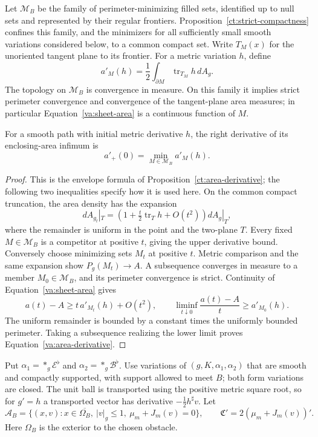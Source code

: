 Let \(\mathcal M_B\) be the family of perimeter-minimizing filled sets,
identified up to null sets and represented by their regular frontiers.
Proposition~\ref{ct:strict-compactness} confines this family, and the minimizers
for all sufficiently small smooth variations considered below, to a common
compact set.  Write \(T_M(x)\) for the unoriented tangent plane to its
frontier.  For a metric variation \(h\), define
\begin{equation}\label{va:sheet-area}
 a'_M(h)=\frac12\int_{\partial M}\operatorname{tr}_{T_M}h\,dA_g.
\end{equation}
The topology on \(\mathcal M_B\) is convergence in measure.  On this
family it implies strict perimeter convergence and convergence of the
tangent-plane area measures; in particular Equation~\eqref{va:sheet-area}
is a continuous function of \(M\).

\begin{lemma}\label{va:area-envelope}
For a smooth path with initial metric derivative \(h\), the right
derivative of its enclosing-area infimum is
\begin{equation}\label{va:area-derivative}
 a'_+(0)=\min_{M\in\mathcal M_B}a'_M(h).
\end{equation}
\end{lemma}
\begin{proof}
This is the envelope formula of Proposition~\ref{ct:area-derivative}; the
following two inequalities specify how it is used here.  On the common
compact truncation, the area density has the expansion
\[
 dA_{g_t}|_T=\left(1+\tfrac t2\operatorname{tr}_T h+O(t^2)\right)dA_g|_T,
\]
where the remainder is uniform in the point and the two-plane \(T\).
Every fixed \(M\in\mathcal M_B\) is a competitor at positive \(t\), giving
the upper derivative bound.  Conversely choose minimizing sets \(M_t\)
at positive \(t\).  Metric comparison and the same expansion show
\(P_g(M_t)\to A\).  A subsequence converges in measure to a member
\(M_0\in\mathcal M_B\), and its perimeter convergence is strict.
Continuity of Equation~\eqref{va:sheet-area} gives
\[
 a(t)-A\ge t\,a'_{M_t}(h)+O(t^2),
 \qquad \liminf_{t\downarrow0}\frac{a(t)-A}{t}\ge a'_{M_0}(h).
\]
The uniform remainder is bounded by a constant times the uniformly
bounded perimeter.  Taking a subsequence realizing the lower limit proves
Equation~\eqref{va:area-derivative}.
\end{proof}

Put \(\alpha_1=*_{g}\mathcal E^\flat\) and
\(\alpha_2=*_{g}\mathcal B^\flat\).  Use variations of
\((g,K,\alpha_1,\alpha_2)\) that are smooth and compactly supported,
with support allowed to meet \(B\); both form variations are closed.
The unit ball is transported using the positive metric square root, so
for \(g'=h\) a transported vector has derivative
\(-\tfrac12h^\sharp v\).  Let
\begin{equation}\label{va:active-rays}
 \mathcal A_B=\{(x,v):x\in\overline{\Omega_B},\ |v|_g\le1,
                  \ \mu_m+J_m(v)=0\},\qquad
 \mathfrak C'=2(\mu_m+J_m(v))'.
\end{equation}
Here \(\Omega_B\) is the exterior to the chosen obstacle.

